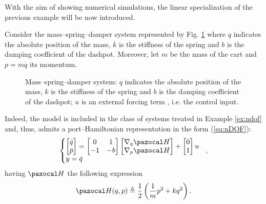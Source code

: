 %
With the aim of showing numerical simulations, the linear specialization of the previous example will be now introduced.
%
\begin{exmp}\label{ex:msd}
    Consider the mass--spring--damper system represented by Fig. \ref{fig:msd} where $q$ indicates the absolute position of the mass, $k$ is the stiffness of the spring and $b$ is the damping coefficient of the dashpot. Moreover, let $m$ be the mass of the cart and $p = m\dot{q}$ its momentum. 
    \begin{figure}[!ht]
	    \centering
	    
        \caption[Mass--spring--damper system.]{Mass--spring--damper system: $q$ indicates the absolute position of the mass, $k$ is the stiffness of the spring and $b$ is the damping coefficient of the dashpot; $u$ is an external forcing term , i.e. the control input.}
        \label{fig:msd}
    \end{figure}
    Indeed, the model is included in the class of systems treated in Example \ref{ex:ndof} and, thus, admits a port--Hamiltonian representation in the form (\ref{eq:nDOF}):
    \begin{equation}\label{eq:msd}
	    \left\{
	        \begin{matrix*}[l]
	        \begin{bmatrix}	\dot{q}\\\dot{p}\end{bmatrix} 
        	=
	        \begin{bmatrix}0&1\\-1&-b\end{bmatrix}
	        \begin{bmatrix}{\nabla}_{q}\Ha\\{\nabla}_{p}\Ha\end{bmatrix}
	        +
	        \begin{bmatrix}0\\1\end{bmatrix}u\\
	        y = \dot{q}
	    \end{matrix*}
	    \right.~~,
    \end{equation}
    having $\Ha$ the following expression
    \begin{equation}
        \Ha(q,p) \triangleq \frac{1}{2}\left(\frac{1}{m}p^2 + kq^2\right).
    \end{equation}
    

\end{exmp}
